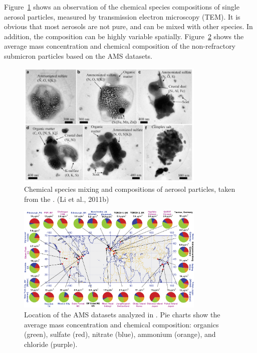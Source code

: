 \documentclass[12pt, fullpage]{uiucthesis2009}
\begin{document}
	Figure~\ref{fig_P5} shows an observation of the chemical species compositions of single aerosol particles, measured by transmission electron microscopy (TEM). It is obvious that most aerosols are not pure, and can be mixed with other species. In addition, the composition can be highly variable spatially. Figure~\ref{fig_P27} shows the average mass concentration and chemical composition of the non-refractory submicron particles based on the AMS datasets.
	
		\begin{figure}[h] 
			\begin{center}
				\includegraphics[width = 0.8\textwidth]{Figure05}
				\caption[Chemical species mixing and compositions of aerosol particles, taken from the . (Li et al., 2011b)]{\label{fig_P5} Chemical species mixing and compositions of aerosol particles, taken from the . (Li et al., 2011b)}
			\end{center}
		\end{figure}
	
	 \begin{figure}[h] 
		\begin{center}
			\includegraphics[width = 0.8\textwidth]{Figure27}
			\caption[Location of the AMS datasets analyzed in \cite{Zhang2015}. Pie charts show the average mass concentration and chemical composition: organics (green), sulfate (red), nitrate (blue), ammonium (orange), and chloride (purple)]{\label{fig_P27} Location of the AMS datasets analyzed in \cite{Zhang2015}. Pie charts show the average mass concentration and chemical composition: organics (green), sulfate (red), nitrate (blue), ammonium (orange), and chloride (purple).}
		\end{center}
	\end{figure}
	
\end{document}
